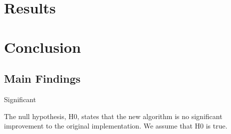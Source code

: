\documentclass{article}
\begin{document}
\section{Results} %






\section{Conclusion} %
\subsection{Main Findings}
Significant

The null hypothesis, H0, states that the new algorithm is no significant improvement to the original implementation.
We assume that H0 is true.

\end{document}
